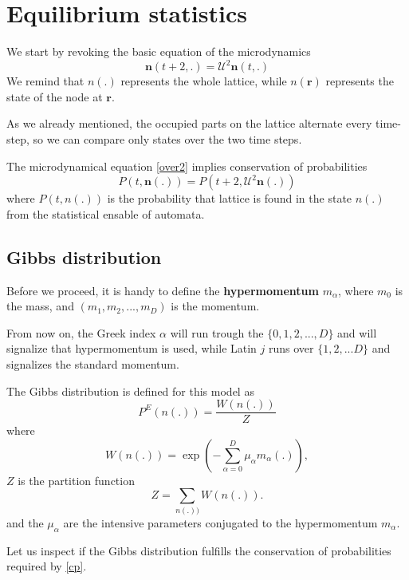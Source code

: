 \section{Equilibrium statistics}
We start by revoking the basic equation of the microdynamics
\begin{equation} \label{over2}
\bm{n}(t+2,.) = \mathcal{U}^2 \bm{n}(t,.)
\end{equation}
We remind that $n(.)$ represents the whole lattice, while $n(\bm{r})$ represents the state of the node at $\bm{r}$.

As we already mentioned, the occupied parts on the lattice alternate every time-step, so we can compare only states over the two time steps.

The microdynamical equation \ref{over2} implies conservation of probabilities
\begin{equation} \label{cp}
P(t,\bm{n}(.)) = P(t+2,\mathcal{U}^2\bm{n}(.))
\end{equation}
where $P(t,n(.))$ is the probability that lattice is found in the state $n(.)$ from the statistical ensable of automata.

\subsection{Gibbs distribution}

Before we proceed, it is handy to define the \textbf{hypermomentum} $m_{\alpha}$, where $m_{0}$ is the mass, and $(m_1,m_2,...,m_D)$ is the momentum. 

From now on, the Greek index $\alpha$ will run trough the $\{0,1,2,...,D\}$ and will signalize that hypermomentum is used, while Latin $j$ runs over $\{1,2,...D\}$ and signalizes the standard momentum.

The Gibbs distribution is defined for this model as
\begin{equation} \label{gibbs}
P^E(n(.)) = \frac{W(n(.))}{Z}
\end{equation}
where
\begin{equation}
W(n(.)) = \exp(-\sum_{\alpha = 0}^D \mu_{\alpha} m_{\alpha}(.)),
\end{equation} 
$Z$ is the partition function
\begin{equation}
Z = \sum_{n(.))} W(n(.)).
\end{equation}
and the $\mu_{\alpha}$ are the intensive parameters conjugated to the hypermomentum $m_{\alpha}$. 

Let us inspect if the Gibbs distribution fulfills the conservation of probabilities required by \ref{cp}.

